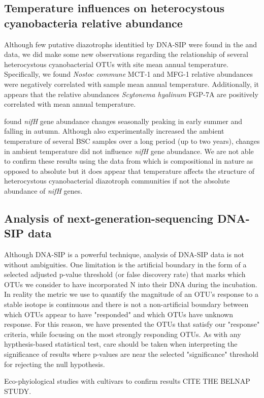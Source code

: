 \subsection{Temperature influences on heterocystous cyanobacteria relative abundance}
Although few putative diazotrophs identitied by DNA-SIP were found in the \citet{Garcia_Pichel_2013} and \citet{Steven_2013} data, we did make some new observations regarding the relationship of several heterocystous cyanobacterial OTUs with site mean annual temperature. Specifically, we found \textit{Nostoc commune} MCT-1 and MFG-1 relative abundances were negatively correlated with sample mean annual temperature. Additionally, it appears that the relative abundances \textit{Scytonema hyalinum} FGP-7A  are positively correlated with mean annual temperature.

\citet{Yeager_2012} found \textit{nifH} gene abundance changes seasonally peaking in early summer and falling in autumn. Although \citet{Yeager_2013} also experimentally increased the ambient temperature of several BSC samples over a long period (up to two years), changes in ambient temperature did not influence \textit{nifH} gene abundance. We are not able to confirm these results using the data from \citet{Garcia_Pichel_2013} which is compositional in nature as opposed to absolute but it does appear that temperature affects the structure of heterocystous cyanobacterial diazotroph communities if not the absolute abundance of \textit{nifH} genes. 

\subsection{Analysis of next-generation-sequencing DNA-SIP data}
Although DNA-SIP is a powerful technique, analysis of DNA-SIP data is not without ambiguities. One limitation is the artificial boundary in the form of a selected adjusted p-value threshold (or false discovery rate) that marks which OTUs we consider to have incorporated N into their DNA during the incubation. In reality the metric we use to quantify the magnitude of an OTU's response to a stable isotope is continuous and there is not a non-artificial boundary between which OTUs appear to have "responded" and which OTUs have unknown response. For this reason, we have presented the OTUs that satisfy our "response" criteria, while focusing on the most strongly responding OTUs. As with any hypthesis-based statistical test, care should be taken when interpreting the significance of results where p-values are near the selected "significance" threshold for rejecting the null hypothesis.

Eco-phyiological studies with cultivars to confirm results CITE THE BELNAP STUDY.

